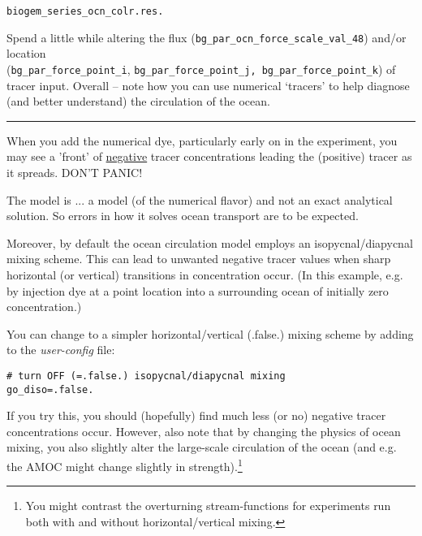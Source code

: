 \vspace{-2mm}\small
\begin{verbatim}
biogem_series_ocn_colr.res.
\end{verbatim}
\normalsize\vspace{-2mm}

Spend a little while altering the flux (\texttt{\small bg\_par\_ocn\_force\_scale\_val\_48}) and/or location
\\(\texttt{\small bg\_par\_force\_point\_i}, \texttt{\small bg\_par\_force\_point\_j, bg\_par\_force\_point\_k}) of tracer input. Overall -- note how you can use numerical ‘tracers’ to help diagnose (and better understand) the circulation of the ocean.

\vspace{1mm}
\noindent\rule{4cm}{0.5pt}
\vspace{2mm}

\newpage 
%
\noindent When you add the numerical dye, particularly early on in the experiment, you may see a 'front' of \uline{negative} tracer concentrations leading the (positive) tracer as it spreads. DON'T PANIC!

The model is ... a model (of the numerical flavor) and not an exact analytical solution. So errors in how it solves ocean transport are to be expected.

Moreover, by default the ocean circulation model employs an isopycnal/diapycnal mixing scheme. This can lead to unwanted negative tracer values when sharp horizontal (or vertical) transitions in concentration occur. (In this example, e.g. by injection dye at a point location into a surrounding ocean of initially zero concentration.)

You can change to a simpler horizontal/vertical (.false.) mixing scheme by adding to the \textit{user-config} file:

\vspace{-2mm}\small
\begin{verbatim}
# turn OFF (=.false.) isopycnal/diapycnal mixing
go_diso=.false.
\end{verbatim}
\normalsize\vspace{-2mm}

If you try this, you should (hopefully) find much less (or no) negative tracer concentrations occur. However, also note that by changing the physics of ocean mixing, you also slightly alter the large-scale circulation of the ocean (and e.g. the AMOC might change slightly in strength).\footnote{You might contrast the overturning stream-functions for experiments run both with and without horizontal/vertical mixing.} 


